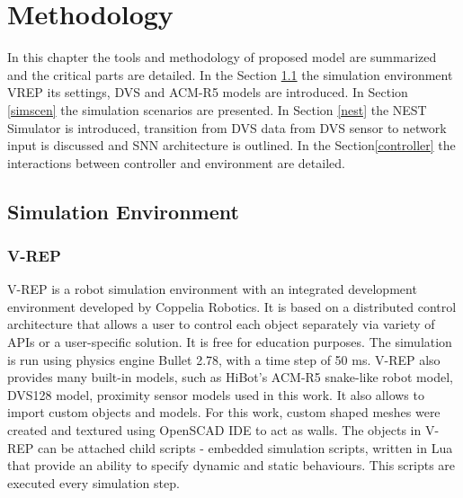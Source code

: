 
\chapter{Methodology}\label{chapter:methodology}

In this chapter the tools and methodology of proposed model are summarized and the critical parts are detailed. In the Section \ref{simenv} the simulation environment VREP its settings, DVS and ACM-R5 models are introduced. In Section \ref{simscen} the simulation scenarios are presented. In Section \ref{nest} the NEST Simulator is introduced, transition from DVS data from DVS sensor to network input is discussed and SNN architecture is outlined. In the Section\ref{controller} the interactions between controller and environment are detailed.

\section{Simulation Environment}\label{simenv}

\subsection{V-REP}
V-REP is a robot simulation environment with an integrated development environment developed by Coppelia Robotics. It is based on a distributed control architecture that allows a user to control each object separately via variety of APIs or a user-specific solution\cite{1}. It is free for education purposes. The simulation is run using physics engine Bullet 2.78, with a time step of 50 ms. V-REP also provides many built-in models, such as HiBot's ACM-R5 snake-like robot model, DVS128 model, proximity sensor models used in this work. It also allows to import custom objects and models. For this work, custom shaped meshes were created and textured using OpenSCAD IDE to act as walls. The objects in V-REP can be attached child scripts - embedded simulation scripts, written in Lua that provide an ability to specify dynamic and static behaviours. This scripts are executed every simulation step.

